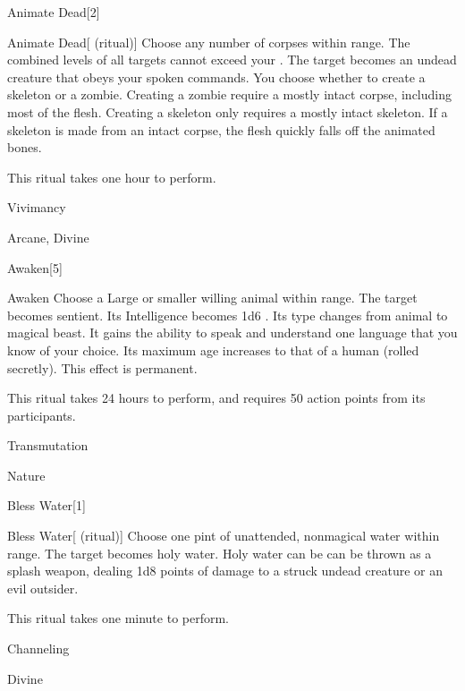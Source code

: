 
\begin{spellsection}{Animate Dead}[2]

\begin{spellheader}
\end{spellheader}


\begin{ability}{Animate Dead}[ (ritual)]
Choose any number of corpses within \rngclose range.
The combined levels of all targets cannot exceed your .
The target becomes an undead creature that obeys your spoken commands.
You choose whether to create a skeleton or a zombie.
Creating a zombie require a mostly intact corpse, including most of the flesh.
Creating a skeleton only requires a mostly intact skeleton.
If a skeleton is made from an intact corpse, the flesh quickly falls off the animated bones.

This ritual takes one hour to perform.
\end{ability}




 Vivimancy

 Arcane, Divine
\end{spellsection}


\begin{spellsection}{Awaken}[5]


\begin{ability}{Awaken}
Choose a Large or smaller willing animal within \rngclose range.
The target becomes sentient.
Its Intelligence becomes 1d6 .
Its type changes from animal to magical beast.
It gains the ability to speak and understand one language that you know of your choice.
Its maximum age increases to that of a human (rolled secretly).
This effect is permanent.

This ritual takes 24 hours to perform, and requires 50 action points from its participants.
\end{ability}




 Transmutation

 Nature
\end{spellsection}


\begin{spellsection}{Bless Water}[1]


\begin{ability}{Bless Water}[ (ritual)]
Choose one pint of unattended, nonmagical water within \rngclose range.
The target becomes holy water.
Holy water can be can be thrown as a splash weapon, dealing 1d8 points of damage to a struck undead creature or an evil outsider.

This ritual takes one minute to perform.
\end{ability}




 Channeling

 Divine
\end{spellsection}


